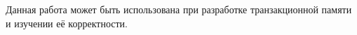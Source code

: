 Данная работа может быть использована при разработке транзакционной памяти и изучении её корректности. 
 

\printbibliography[heading=bibintoc%
]


